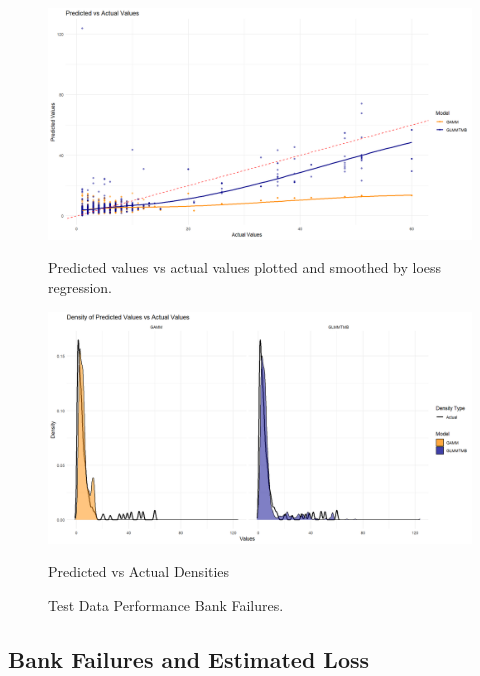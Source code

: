 \documentclass[12pt, twoside,hidelinks]{article}
\theoremstyle{definition}
\numberwithin{equation}{section}
\begin{document}
\begin{figure}[H]
    \centering
        \includegraphics[width=\textwidth]{visuals/Bank_fail_count/pred_vs_acutal_fail_count_loess.png}
        \caption*{Predicted values vs actual values plotted and smoothed by loess regression. }
        \label{fig:hist_pred_errors}

        \includegraphics[width=\textwidth]{visuals/Bank_fail_count/pred_vs_actual_fail_count_density.png}
        \caption*{Predicted vs Actual Densities}
        \label{fig:predicted_vs_actual_densities}

    \caption{Test Data Performance Bank Failures.}
    \label{fig:test_data_performance_2}
\end{figure}


\subsection{Bank Failures and Estimated Loss}\label{sec:analysis:bank_fail_cost}
\end{document}

